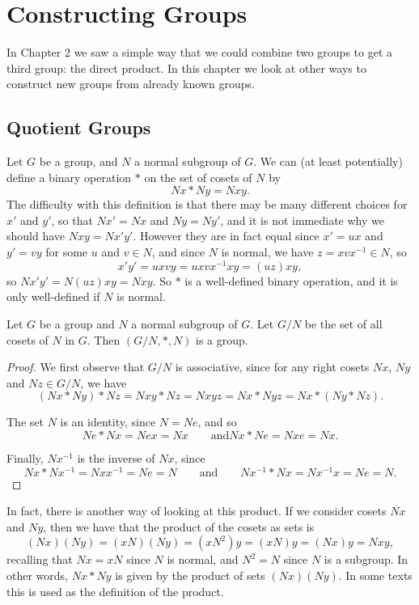 \chapter{Constructing Groups}

In Chapter 2 we saw a simple way that we could combine two groups to 
get a third group: the direct product.  In this chapter we look at 
other ways to construct new groups from already known groups.

\section{Quotient Groups}

Let $G$ be a group, and $N$ a normal subgroup of $G$.  We can (at least
potentially) define a binary operation $\ast$ on the set of cosets of $N$
by
\[
  Nx \ast Ny = Nxy.
\]
The difficulty with this definition is that there may be many
different choices for $x'$ and $y'$, so that $Nx' = Nx$
and $Ny = Ny'$, and it is not immediate why we should have $Nxy =
Nx'y'$.  However they are in fact equal since $x' = ux$ and $y' = vy$ for some
$u$ and $v \in N$, and since $N$ is normal, we have $z = xvx^{-1} \in N$, so
\[
  x'y' = uxvy = uxvx^{-1}xy = (uz)xy,
\]
so $Nx'y' = N(uz)xy = Nxy$.  So $\ast$ is a well-defined binary 
operation, and it is only well-defined if $N$ is normal.

\begin{proposition}
  Let $G$ be a group and $N$ a normal subgroup of $G$.  Let $G/N$ be the set
  of all cosets of $N$ in $G$. Then $(G/N, \ast, N)$ is a group.
\end{proposition}
\begin{proof}
  We first observe that $G/N$ is associative, since for any right cosets
  $Nx$, $Ny$ and $Nz \in G/N$, we have
  \[
    (Nx \ast Ny) \ast Nz = Nxy \ast Nz = Nxyz = Nx \ast Nyz = Nx 
    \ast (Ny \ast Nz).
  \]
  
  The set $N$ is an identity, since $N = Ne$, and so
  \[
    Ne \ast Nx = Nex = Nx \qquad \text{and} Nx \ast Ne = Nxe = Nx.
  \]
  
  Finally, $Nx^{-1}$ is the inverse of $Nx$, since
  \[
    Nx \ast Nx^{-1} = Nxx^{-1} = Ne = N \qquad \text{and} \qquad 
    Nx^{-1} \ast Nx = Nx^{-1}x = Ne = N.
  \]
\end{proof}

In fact, there is another way of looking at this product.  If we 
consider cosets $Nx$ and $Ny$, then we have that the product of the 
cosets as sets is
\[
  (Nx)(Ny) = (xN)(Ny) = (xN^{2})y = (xN)y = (Nx)y = Nxy,
\]
recalling that $Nx = xN$ since $N$ is normal, and $N^{2} = N$ since
$N$ is a subgroup.  In other words, $Nx \ast Ny$ is given by the
product of sets $(Nx)(Ny)$.  In some texts this is used as the 
definition of the product.

